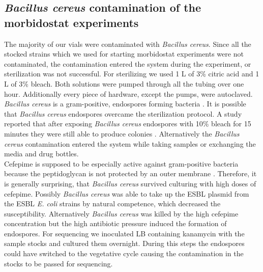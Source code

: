 \subsection{\textit{Bacillus cereus} contamination of the morbidostat experiments}
The majority of our vials were contaminated with \textit{Bacillus cereus}. Since all the stocked strains which we used for starting morbidostat experiments were not contaminated, the contamination entered the system during the experiment, or sterilization was not successful. For sterilizing we used 1 L of 3\% citric acid and 1 L of 3\% bleach. Both solutions were pumped through all the tubing over one hour. Additionally every piece of hardware, except the pumps, were autoclaved. \textit{Bacillus cereus} is a gram-positive, endospores forming bacteria \cite{bintsis_foodborne_2017}. It is possible that \textit{Bacillus cereus} endospores overcame the sterilization protocol. A study reported that after exposing \textit{Bacillus cereus} endospores with 10\% bleach for 15 minutes they were still able to produce colonies \cite{robertson_effect_2018}. Alternatively the \textit{Bacillus cereus} contamination entered the system while taking samples or exchanging the media and drug bottles. \\
Cefepime is supposed to be especially active against gram-positive bacteria because the peptidoglycan is not protected by an outer membrane \cite{sykes_chapter_2014}. Therefore, it is generally surprising, that \textit{Bacillus cereus} survived culturing with high doses of cefepime. Possibly \textit{Bacillus cereus} was able to take up the ESBL plasmid from the ESBL \textit{E. coli} strains by natural competence, which decreased the susceptibility. Alternatively \textit{Bacillus cereus} was killed by the high cefepime concentration but the high antibiotic pressure induced the formation of endospores. For sequencing we inoculated LB containing kanamycin with the sample stocks and cultured them overnight. During this steps the endospores could have switched to the vegetative cycle causing the contamination in the stocks to be passed for sequencing.

